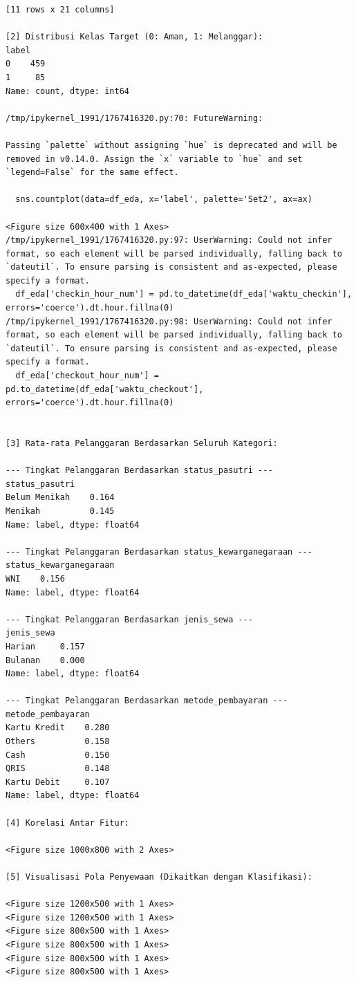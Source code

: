 \begin{lstlisting}[caption={Output 13}]
[11 rows x 21 columns]

[2] Distribusi Kelas Target (0: Aman, 1: Melanggar):
label
0    459
1     85
Name: count, dtype: int64

/tmp/ipykernel_1991/1767416320.py:70: FutureWarning: 

Passing `palette` without assigning `hue` is deprecated and will be removed in v0.14.0. Assign the `x` variable to `hue` and set `legend=False` for the same effect.

  sns.countplot(data=df_eda, x='label', palette='Set2', ax=ax)

<Figure size 600x400 with 1 Axes>
/tmp/ipykernel_1991/1767416320.py:97: UserWarning: Could not infer format, so each element will be parsed individually, falling back to `dateutil`. To ensure parsing is consistent and as-expected, please specify a format.
  df_eda['checkin_hour_num'] = pd.to_datetime(df_eda['waktu_checkin'], errors='coerce').dt.hour.fillna(0)
/tmp/ipykernel_1991/1767416320.py:98: UserWarning: Could not infer format, so each element will be parsed individually, falling back to `dateutil`. To ensure parsing is consistent and as-expected, please specify a format.
  df_eda['checkout_hour_num'] = pd.to_datetime(df_eda['waktu_checkout'], errors='coerce').dt.hour.fillna(0)


[3] Rata-rata Pelanggaran Berdasarkan Seluruh Kategori:

--- Tingkat Pelanggaran Berdasarkan status_pasutri ---
status_pasutri
Belum Menikah    0.164
Menikah          0.145
Name: label, dtype: float64

--- Tingkat Pelanggaran Berdasarkan status_kewarganegaraan ---
status_kewarganegaraan
WNI    0.156
Name: label, dtype: float64

--- Tingkat Pelanggaran Berdasarkan jenis_sewa ---
jenis_sewa
Harian     0.157
Bulanan    0.000
Name: label, dtype: float64

--- Tingkat Pelanggaran Berdasarkan metode_pembayaran ---
metode_pembayaran
Kartu Kredit    0.280
Others          0.158
Cash            0.150
QRIS            0.148
Kartu Debit     0.107
Name: label, dtype: float64

[4] Korelasi Antar Fitur:

<Figure size 1000x800 with 2 Axes>

[5] Visualisasi Pola Penyewaan (Dikaitkan dengan Klasifikasi):

<Figure size 1200x500 with 1 Axes>
<Figure size 1200x500 with 1 Axes>
<Figure size 800x500 with 1 Axes>
<Figure size 800x500 with 1 Axes>
<Figure size 800x500 with 1 Axes>
<Figure size 800x500 with 1 Axes>


\end{lstlisting}
